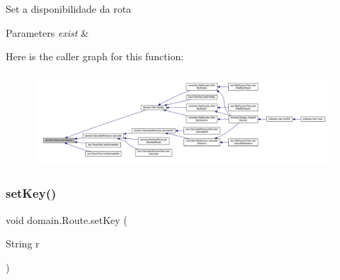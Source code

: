 Set a disponibilidade da rota 
\begin{DoxyParams}{Parameters}
{\em exist} & \\
\hline
\end{DoxyParams}
Here is the caller graph for this function\+:\nopagebreak
\begin{figure}[H]
\begin{center}
\leavevmode
\includegraphics[width=350pt]{classdomain_1_1_route_a55e0dd8f63814b1708275082f4ba5fc4_icgraph}
\end{center}
\end{figure}
\mbox{\label{classdomain_1_1_route_a3b472fbb44362997723edf02014bc77f}} 
\subsubsection{\texorpdfstring{set\+Key()}{setKey()}}
{\footnotesize\ttfamily void domain.\+Route.\+set\+Key (\begin{DoxyParamCaption}\item[{String}]{r }\end{DoxyParamCaption})}

